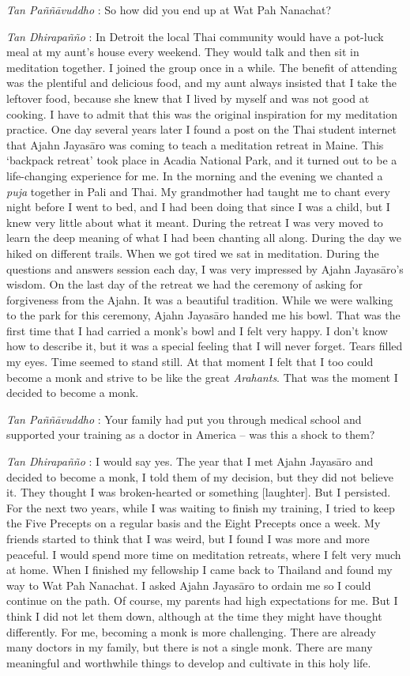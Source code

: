 \emph{Tan Paññāvuddho} : So how did you end up at Wat Pah Nanachat?

\emph{Tan Dhirapañño} : In Detroit the local Thai community would have a
pot-luck meal at my aunt's house every weekend. They would talk and then
sit in meditation together. I joined the group once in a while. The
benefit of attending was the plentiful and delicious food, and my aunt
always insisted that I take the leftover food, because she knew that I
lived by myself and was not good at cooking. I have to admit that this
was the original inspiration for my meditation practice. One day several
years later I found a post on the Thai student internet that Ajahn
Jayasāro was coming to teach a meditation retreat in Maine. This
`backpack retreat' took place in Acadia National Park, and it turned out
to be a life-changing experience for me. In the morning and the evening
we chanted a \emph{puja} together in Pali and Thai. My grandmother had
taught me to chant every night before I went to bed, and I had been
doing that since I was a child, but I knew very little about what it
meant. During the retreat I was very moved to learn the deep meaning of
what I had been chanting all along. During the day we hiked on different
trails. When we got tired we sat in meditation. During the questions and
answers session each day, I was very impressed by Ajahn Jayasāro's
wisdom. On the last day of the retreat we had the ceremony of asking for
forgiveness from the Ajahn. It was a beautiful tradition. While we were
walking to the park for this ceremony, Ajahn Jayasāro handed me his
bowl. That was the first time that I had carried a monk's bowl and I
felt very happy. I don't know how to describe it, but it was a special
feeling that I will never forget. Tears filled my eyes. Time seemed to
stand still. At that moment I felt that I too could become a monk and
strive to be like the great \emph{Arahants}. That was the moment I
decided to become a monk.

\emph{Tan Paññāvuddho} : Your family had put you through medical school
and supported your training as a doctor in America -- was this a shock
to them?

\emph{Tan Dhirapañño} : I would say yes. The year that I met Ajahn
Jayasāro and decided to become a monk, I told them of my decision, but
they did not believe it. They thought I was broken-hearted or something
{[}laughter{]}. But I persisted. For the next two years, while I was
waiting to finish my training, I tried to keep the Five Precepts on a
regular basis and the Eight Precepts once a week. My friends started to
think that I was weird, but I found I was more and more peaceful. I
would spend more time on meditation retreats, where I felt very much at
home. When I finished my fellowship I came back to Thailand and found my
way to Wat Pah Nanachat. I asked Ajahn Jayasāro to ordain me so I could
continue on the path. Of course, my parents had high expectations for
me. But I think I did not let them down, although at the time they might
have thought differently. For me, becoming a monk is more challenging.
There are already many doctors in my family, but there is not a single
monk. There are many meaningful and worthwhile things to develop and
cultivate in this holy life.

